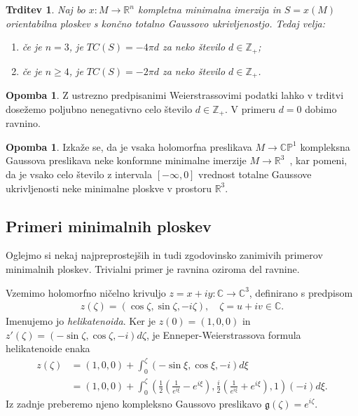 \documentclass[12pt,a4paper,twoside]{article}
\theoremstyle{definition} %
\newtheorem{opomba}[definicija]{Opomba}
\theoremstyle{plain} %
\newtheorem{trditev}[definicija]{Trditev}
\numberwithin{equation}{section}  %
\newcommand{\R}{\mathbb R}
\newcommand{\Z}{\mathbb Z}
\begin{document}
\begin{trditev}
Naj bo $x \colon M \to \R^{n}$ kompletna minimalna imerzija in $S = x(M)$ orientabilna ploskev s končno totalno Gaussovo ukrivljenostjo. Tedaj velja:
\begin{enumerate}
\item če je $n=3$, je $TC(S) = -4\pi d$ za neko število $d \in \Z_{+}$;
\item če je $n \geq 4$, je $TC(S) = -2\pi d$ za neko število $d \in \Z_{+}$.
\end{enumerate}
\end{trditev}

\begin{opomba}
Z ustrezno predpisanimi Weierstrassovimi podatki lahko v trditvi dosežemo poljubno nenegativno celo število $d \in \Z_{+}$.
V primeru $d=0$ dobimo ravnino.
\end{opomba}

\begin{opomba}
Izkaže se, da je vsaka holomorfna preslikava $M \to \mathbb{CP}^1$ kompleksna Gaussova preslikava neke konformne minimalne imerzije $M \to \R^3$~\cite[Theorem~5.4.1]{alarcon2021minimal}, kar pomeni, da je vsako celo število z intervala $[-\infty, 0]$ vrednost totalne Gaussove ukrivljenosti neke minimalne ploskve v prostoru $\R^3$.
\end{opomba}

\subsection{Primeri minimalnih ploskev}
%
Oglejmo si nekaj najpreprostejših in tudi zgodovinsko zanimivih primerov minimalnih ploskev.
Trivialni primer je ravnina oziroma del ravnine.

Vzemimo holomorfno ničelno krivuljo $z = x + iy \colon \mathbb{C} \to \mathbb{C}^3$, definirano s predpisom
\begin{gather} \label{eq:helikatenoida}
z(\zeta) = (\cos \zeta, \sin \zeta, -i\zeta), \quad \zeta = u + iv \in \mathbb{C}.
\end{gather} 
Imenujemo jo \emph{helikatenoida}.
Ker je $z(0) = (1,0,0)$ in $z'(\zeta) = (-\sin \zeta, \cos \zeta, -i) d\zeta$, je Enneper-Weierstrassova formula helikatenoide enaka
\begin{align} \label{eq:EP-helikatenoida}
z(\zeta) &= (1,0,0) + \int_{0}^{\zeta} (-\sin \xi, \cos \xi, -i) d\xi \nonumber \\
	&= (1,0,0) + \int_{0}^{\zeta} \left( \frac{1}{2} \left(\frac{1}{e^{i\xi}} - e^{i\xi} \right), \frac{i}{2} \left(\frac{1}{e^{i\xi}} + e^{i\xi} \right), 1 \right) (-i) d\xi.
\end{align}
Iz zadnje preberemo njeno kompleksno Gaussovo preslikavo $\mathfrak{g}(\zeta) = e^{i\zeta}$.
\end{document}
